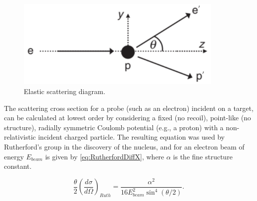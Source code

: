         \begin{figure}[H]
            \centering
            \includegraphics[width=10cm]{Chapters/Ch1-Intro/Ch1-Sec1-Background/pics/elastic-ep/kine-e-2.PNG}
            \caption{Elastic scattering diagram.}
        \end{figure}
            
        
        

        


        The scattering cross section for a probe (such as an electron) incident on a target, can be calculated at lowest order by considering a fixed (no recoil), point-like (no structure),  radially symmetric Coulomb potential (e.g., a proton) with a non-relativistic incident charged particle. The resulting equation was used by Rutherford's group in the discovery of the nucleus, and for an electron beam of energy  $E_{beam}$ is given by \eqref{eq:RutherfordDiffX}, where $\alpha$ is the fine structure constant.

            \begin{equation}\label{eq:RutherfordDiffX}
                {\frac{\theta}{2}}(\frac{d\sigma}{d\Omega})_{Ruth} = \frac{\alpha^2}{16E^2_{beam}\sin^4{(\theta/2)}}.
            \end{equation}

